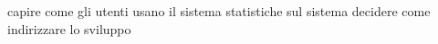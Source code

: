 capire come gli utenti usano il sistema
statistiche sul sistema
decidere come indirizzare lo sviluppo